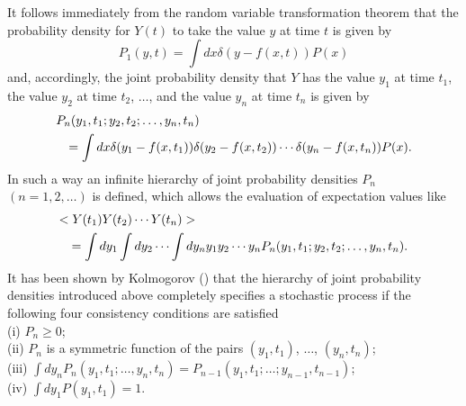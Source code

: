 It follows immediately from the random variable transformation 
theorem that the probability density for $Y(t)$ to take the value
$y$ at time $t$ is given by
\begin{equation*}
P_1(y,t) = \int dx  \delta(y-f(x,t)) P(x)
\end{equation*}
and, accordingly, the joint probability density that $Y$ has the
value $y_1$ at time $t_1$, the value $y_2$ at time $t_2$, 
$\ldots$, and the value $y_n$ at time $t_n$ is given by
\begin{eqnarray*}
\lefteqn{P_n(y_1,t_1;y_2,t_2; \ldots, y_n,t_n)} \\
&& = \int dx \delta(y_1-f(x,t_1))\delta(y_2-f(x,t_2)) \cdots 
   \delta(y_n-f(x,t_n))  P(x).
\end{eqnarray*}
In such a way an infinite hierarchy of joint probability densities
$P_n$ $(n=1,2,\ldots)$ is defined, which allows the evaluation of 
expectation values like
\begin{eqnarray*}
\lefteqn{<Y(t_1) Y(t_2) \cdots Y(t_n)>} \\
&& = \int dy_1 \int dy_2 \cdots \int dy_n 
        y_1 y_2 \cdots y_n P_n(y_1,t_1;y_2,t_2; \ldots, y_n,t_n).
\end{eqnarray*}
It has been shown by Kolmogorov (\cite{VAN_KAMPEN}) that the 
hierarchy of joint probability densities introduced above 
completely specifies
a stochastic process if the following four consistency conditions 
are satisfied \\
(i) $P_n \ge 0$; \\
(ii) $P_n$ is a symmetric function of the pairs $(y_1,t_1)$, 
$\ldots$, $(y_n,t_n)$; \\
(iii) $\int dy_n P_n(y_1,t_1; \ldots , y_n,t_n) =
     P_{n-1}(y_1,t_1; \ldots ; y_{n-1},t_{n-1})$; \\
(iv) $\int dy_1 P(y_1,t_1) =1$.

